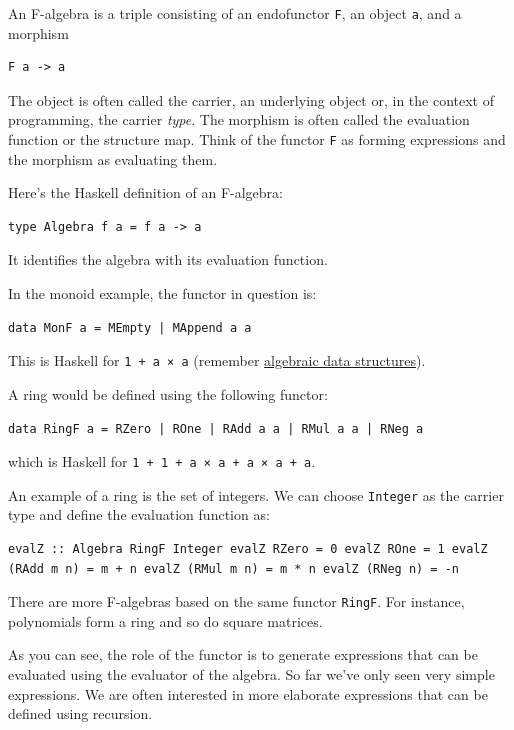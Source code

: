 An F-algebra is a triple consisting of an endofunctor \texttt{F}, an
object \texttt{a}, and a morphism

\begin{verbatim}
F a -> a
\end{verbatim}

The object is often called the carrier, an underlying object or, in the
context of programming, the carrier \emph{type}. The morphism is often
called the evaluation function or the structure map. Think of the
functor \texttt{F} as forming expressions and the morphism as evaluating
them.

Here's the Haskell definition of an F-algebra:

\begin{verbatim}
type Algebra f a = f a -> a
\end{verbatim}

It identifies the algebra with its evaluation function.

In the monoid example, the functor in question is:

\begin{verbatim}
data MonF a = MEmpty | MAppend a a
\end{verbatim}

This is Haskell for \texttt{1\ +\ a\ ×\ a} (remember
\href{https://bartoszmilewski.com/2015/01/13/simple-algebraic-data-types/}{algebraic
data structures}).

A ring would be defined using the following functor:

\begin{verbatim}
data RingF a = RZero | ROne | RAdd a a | RMul a a | RNeg a
\end{verbatim}

which is Haskell for \texttt{1\ +\ 1\ +\ a\ ×\ a\ +\ a\ ×\ a\ +\ a}.

An example of a ring is the set of integers. We can choose
\texttt{Integer} as the carrier type and define the evaluation function
as:

\begin{verbatim}
evalZ :: Algebra RingF Integer evalZ RZero = 0 evalZ ROne = 1 evalZ (RAdd m n) = m + n evalZ (RMul m n) = m * n evalZ (RNeg n) = -n
\end{verbatim}

There are more F-algebras based on the same functor \texttt{RingF}. For
instance, polynomials form a ring and so do square matrices.

As you can see, the role of the functor is to generate expressions that
can be evaluated using the evaluator of the algebra. So far we've only
seen very simple expressions. We are often interested in more elaborate
expressions that can be defined using recursion.

